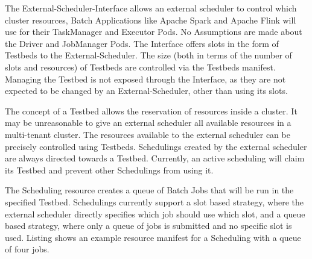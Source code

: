 \documentclass[
]{article}
\author{}
\date{}
\begin{document}
The External-Scheduler-Interface allows an external scheduler to control
which cluster resources, Batch Applications like Apache Spark and Apache
Flink will use for their TaskManager and Executor Pods. No Assumptions
are made about the Driver and JobManager Pods. The Interface offers
slots in the form of Testbeds to the External-Scheduler. The size (both
in terms of the number of slots and resources) of Testbeds are
controlled via the Testbeds manifest. Managing the Testbed is not
exposed through the Interface, as they are not expected to be changed by
an External-Scheduler, other than using its slots.

The concept of a Testbed allows the reservation of resources inside a
cluster. It may be unreasonable to give an external scheduler all
available resources in a multi-tenant cluster. The resources available
to the external scheduler can be precisely controlled using Testbeds.
Schedulings created by the external scheduler are always directed
towards a Testbed. Currently, an active scheduling will claim its
Testbed and prevent other Schedulings from using it.

The Scheduling resource creates a queue of Batch Jobs that will be run
in the specified Testbed. Schedulings currently support a slot based
strategy, where the external scheduler directly specifies which job
should use which slot, and a queue based strategy, where only a queue of
jobs is submitted and no specific slot is used. Listing shows an example
resource manifest for a Scheduling with a queue of four jobs.
\end{document}
